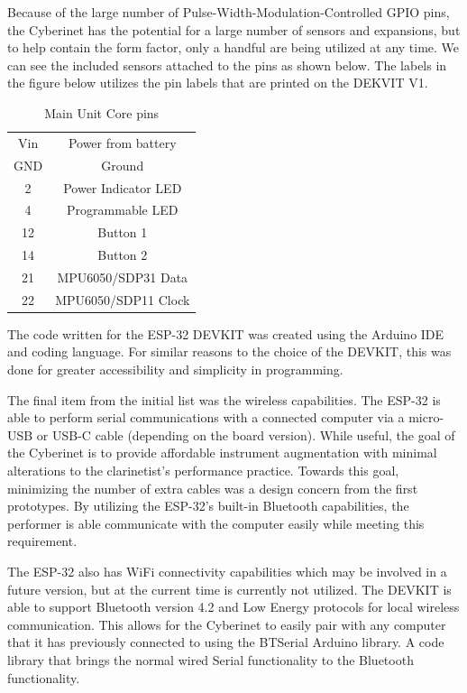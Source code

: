  

Because of the large number of Pulse-Width-Modulation-Controlled GPIO pins, the Cyberinet has the potential for a large number of sensors and expansions, but to help contain the form factor, only a handful are being utilized at any time. We can see the included sensors attached to the pins as shown below. The labels in the figure below utilizes the pin labels that are printed on the DEKVIT V1.

\begin{table}[]
    \centering
    \begin{tabular}{|c||c|}
    \hline
    Vin     & Power from battery \\
    GND     & Ground \\
    2       & Power Indicator LED \\
    4       & Programmable LED \\
    12      & Button 1 \\
    14      & Button 2 \\
    21      & MPU6050/SDP31 Data \\
    22      & MPU6050/SDP11 Clock \\
    \end{tabular}
    \caption{Main Unit Core pins}
    \label{tab:mainPins}
    \hline
\end{table}

The code written for the ESP-32 DEVKIT was created using the Arduino IDE and coding language. For similar reasons to the choice of the DEVKIT, this was done for greater accessibility and simplicity in programming. 

The final item from the initial list was the wireless capabilities. The ESP-32 is able to perform serial communications with a connected computer via a micro-USB or USB-C cable (depending on the board version). While useful, the goal of the Cyberinet is to provide affordable instrument augmentation with minimal alterations to the clarinetist's performance practice. Towards this goal, minimizing the number of extra cables was a design concern from the first prototypes. By utilizing the ESP-32's built-in Bluetooth capabilities, the performer is able communicate with the computer easily while meeting this requirement.

The ESP-32 also has WiFi connectivity capabilities which may be involved in a future version, but at the current time is currently not utilized. The DEVKIT is able to support Bluetooth version 4.2 and Low Energy protocols for local wireless communication. This allows for the Cyberinet to easily pair with any computer that it has previously connected to using the BTSerial Arduino library. A code library that brings the normal wired Serial functionality to the Bluetooth functionality.

